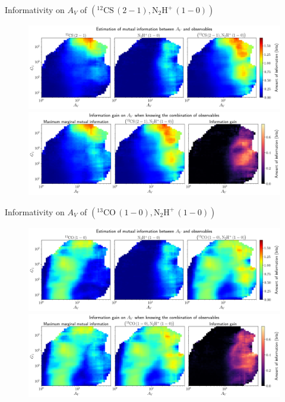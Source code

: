 \documentclass{beamer}
\begin{document}
\begin{frame}{Informativity on $A_V$ of $\left(\mathrm{^{12}CS\,(2-1)},\mathrm{N_2H^+\,(1-0)}\right)$}
    \begin{figure}
        \centering
        \includegraphics[width=0.95\linewidth]{../mi/av__12cs21_n2hp10_mi.png}
        \vfill
        \includegraphics[width=0.95\linewidth]{../mi/av__12cs21_n2hp10_mi_gain.png}
    \end{figure}
\end{frame}

\begin{frame}{Informativity on $A_V$ of $\left(\mathrm{^{13}CO\,(1-0)},\mathrm{N_2H^+\,(1-0)}\right)$}
    \begin{figure}
        \centering
        \includegraphics[width=0.95\linewidth]{../mi/av__13co10_n2hp10_mi.png}
        \vfill
        \includegraphics[width=0.95\linewidth]{../mi/av__13co10_n2hp10_mi_gain.png}
    \end{figure}
\end{frame}
\end{document}
